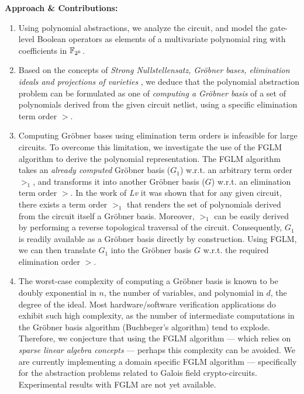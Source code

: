 {\bf Approach \& Contributions:} 

\begin{enumerate}
\item Using polynomial abstractions, we analyze the circuit, and
  model the gate-level Boolean operators as elements of a multivariate
  polynomial ring with coefficients in ${\mathbb{F}}_{2^k}$.

\item Based on the concepts of {\it Strong Nullstellensatz, Gr\"obner
  bases, elimination ideals and projections of varieties}
  \cite{ideals:book}, we deduce that the polynomial abstraction
  problem can be formulated as one of {\it computing a Gr\"obner
    basis} of a set of polynomials derived from the given circuit
  netlist, using a specific elimination term order $>$. 

\item Computing Gr\"obner bases using elimination term orders is
  infeasible for large circuits. To overcome this limitation, we 
  investigate the use of the FGLM algorithm \cite{fglm} to derive the
  polynomial representation. The FGLM algorithm takes an {\it already
    computed} Gr\"obner basis ($G_1$) w.r.t. an arbitrary term order
  $>_1$, and transforms it into another Gr\"obner basis ($G$)
  w.r.t. an elimination term order $>$. In the work of {\it
  Lv} \cite{lv:date2012} it was shown that for any
  given circuit, there exists a term order $>_1$ that renders the set
  of polynomials derived from the circuit itself a Gr\"obner
  basis. Moreover, $>_1$ can be easily derived by performing a reverse
  topological traversal of the circuit. Consequently, $G_1$ is readily
  available as a Gr\"obner basis directly by construction. Using FGLM,
  we can then translate $G_1$ into the Gr\"obner basis $G$
  w.r.t. the required elimination order $>$. 

\item The worst-case complexity of computing a Gr\"obner basis is
  known to be doubly exponential in $n$, the number of variables, and
  polynomial in $d$, the degree of the ideal. Most hardware/software
  verification applications do exhibit such high complexity, as the
  number of intermediate computations in the Gr\"obner basis algorithm
  (Buchbeger's algorithm) \cite{buchberger_thesis} 
  tend to explode. Therefore, we conjecture that using the FGLM
  algorithm --- which relies on {\it sparse linear algebra concepts}
  --- perhaps this complexity can be avoided. We are currently
  implementing a domain specific FGLM algorithm --- specifically for
  the abstraction problems related to Galois field
  crypto-circuits. Experimental results with FGLM are not yet available.


\end{enumerate}
